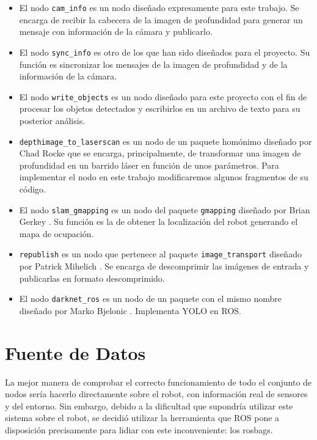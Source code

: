 \begin{itemize}

	\item El nodo \texttt{cam\_info} es un nodo diseñado expresamente para este trabajo. Se encarga de recibir la cabecera de la imagen de profundidad para generar un mensaje con información de la cámara y publicarlo.
	\item El nodo \texttt{sync\_info} es otro de los que han sido diseñados para el proyecto. Su función es sincronizar los mensajes de la imagen de profundidad y de la información de la cámara.
	\item El nodo \texttt{write\_objects} es un nodo diseñado para este proyecto con el fin de procesar los objetos detectados y escribirlos en un archivo de texto para su posterior análisis.
	\item \texttt{depthimage\_to\_laserscan} es un nodo de un paquete homónimo diseñado por Chad Rocke \cite{di2ls} que se encarga, principalmente, de transformar una imagen de profundidad en un barrido láser en función de unos parámetros. Para implementar el nodo en este trabajo modificaremos algunos fragmentos de su código.
	\item El nodo \texttt{slam\_gmapping} es un nodo del paquete \texttt{gmapping} diseñado por Brian Gerkey \cite{gmapping}. Su función es la de obtener la localización del robot generando el mapa de ocupación.
	\item \texttt{republish} es un nodo que pertenece al paquete \texttt{image\_transport} diseñado por Patrick Mihelich \cite{republish}. Se encarga de descomprimir las imágenes de entrada y publicarlas en formato descomprimido.
	\item El nodo \texttt{darknet\_ros} es un nodo de un paquete con el mismo nombre diseñado por Marko Bjelonic \cite{darknet}. Implementa YOLO en ROS.
	
	

\end{itemize}


\section{Fuente de Datos} \label{sec:datos}

La mejor manera de comprobar el correcto funcionamiento de todo el conjunto de nodos sería hacerlo directamente sobre el robot, con información real de sensores y del entorno. Sin embargo, debido a la dificultad que supondría utilizar este sistema sobre el robot, se decidió utilizar la herramienta que ROS pone a disposición precisamente para lidiar con este inconveniente: los rosbags.\\

